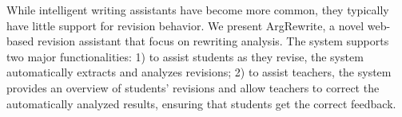 While intelligent writing assistants have become more common, they typically have little support for revision behavior. We present ArgRewrite, a novel web-based revision assistant that focus on rewriting analysis. The system supports two major functionalities: 1) to assist students as they revise, the system automatically extracts and analyzes revisions; 2) to assist teachers, the system provides an overview of students' revisions and allow teachers to correct the automatically analyzed results, ensuring that students get the correct feedback.
